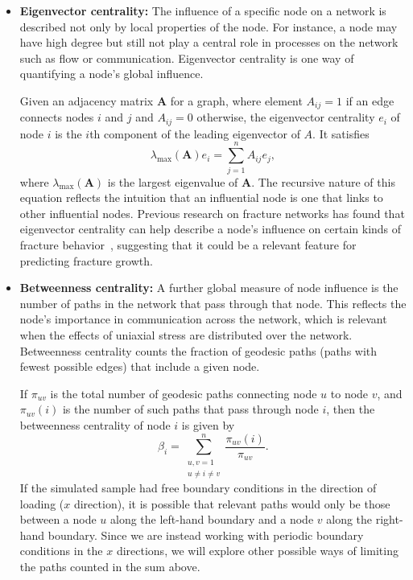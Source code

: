 \begin{itemize}
    
    
    \item \textbf{Eigenvector centrality:} The influence of a specific node on a network is described not only by local properties of the node.  For instance, a node may have high degree but still not play a central role in processes on the network such as flow or communication.  Eigenvector centrality is one way of quantifying a node's global influence.
    
    Given an adjacency matrix $\mathbf{A}$ for a graph, where element $A_{ij}=1$ if an edge connects nodes $i$ and $j$ and $A_{ij}=0$ otherwise, the eigenvector centrality $e_i$ of node $i$ is the $i$th component of the leading eigenvector of $A$.  It satisfies
    \begin{equation}
    \lambda_{\max}(\mathbf{A}) e_i = \sum_{j=1}^n A_{ij}e_j,
    \end{equation}
    where $\lambda_{\max}(\mathbf{A})$ is the largest eigenvalue of $\mathbf{A}$.  The recursive nature of this equation reflects the intuition that an influential node is one that links to other influential nodes.  Previous research on fracture networks has found that eigenvector centrality can help describe a node's influence on certain kinds of fracture behavior~\cite{santiago2016,valera2018machine}, suggesting that it could be a relevant feature for predicting fracture growth.
    
    \item\textbf{Betweenness centrality:} A further global measure of node influence is the number of paths in the network that pass through that node.  This reflects the node's importance in communication across the network, which is relevant when the effects of uniaxial stress are distributed over the network.  Betweenness centrality counts the fraction of geodesic paths (paths with fewest possible edges) that include a given node.
    
    If $\pi_{uv}$ is the total number of geodesic paths connecting node $u$ to node $v$, and $\pi_{uv}(i)$ is the number of such paths that pass through node $i$, then the betweenness centrality of node $i$ is given by
    \begin{equation}
    \beta_i = \sum_{\substack{u,v = 1 \\ u\neq i\neq v }}^n \frac{\pi_{uv}(i)}{\pi_{uv}}.
    \end{equation}
    If the simulated sample had free boundary conditions in the direction of loading ($x$ direction), it is possible that relevant paths would only be those between a node $u$ along the left-hand boundary and a node $v$ along the right-hand boundary.  Since we are instead working with periodic boundary conditions in the $x$ directions, we will explore other possible ways of limiting the paths counted in the sum above.
\end{itemize}

